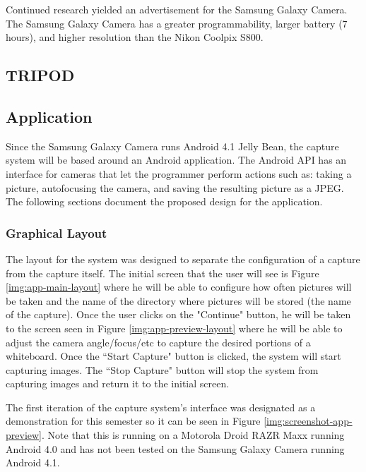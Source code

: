 \documentclass[]{article}
\begin{document}
					Continued research yielded an advertisement for the Samsung Galaxy Camera. The Samsung Galaxy Camera has a greater programmability, larger battery (7 hours), and higher resolution than the Nikon Coolpix S800.
				
			\subsection{TRIPOD}
			
			
			\subsection{Application}
				Since the Samsung Galaxy Camera runs Android 4.1 Jelly Bean, the capture system will be based around an Android application. The Android API has an interface for cameras that let the programmer perform actions such as: taking a picture, autofocusing the camera, and saving the resulting picture as a JPEG. The following sections document the proposed design for the application.
				
				\subsubsection{Graphical Layout}
					The layout for the system was designed to separate the configuration of a capture from the capture itself. The initial screen that the user will see is Figure \ref{img:app-main-layout} where he will be able to configure how often pictures will be taken and the name of the directory where pictures will be stored (the name of the capture). Once the user clicks on the "Continue" button, he will be taken to the screen seen in Figure \ref{img:app-preview-layout} where he will be able to adjust the camera angle/focus/etc to capture the desired portions of a whiteboard. Once the ``Start Capture" button is clicked, the system will start capturing images. The ``Stop Capture" button will stop the system from capturing images and return it to the initial screen. 
					
					The first iteration of the capture system's interface was designated as a demonstration for this semester so it can be seen in Figure \ref{img:screenshot-app-preview}. Note that this is running on a Motorola Droid RAZR Maxx running Android 4.0 and has not been tested on the Samsung Galaxy Camera running Android 4.1. 
									
\end{document}
